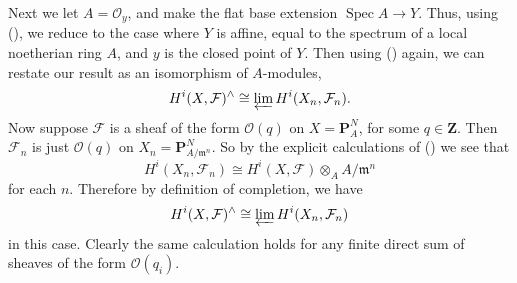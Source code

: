 {Next we let $A=\mathcal O_y$, and make the flat base extension $\operatorname{Spec}A\to Y$. Thus, using (), we reduce to the case where $Y$ is affine, equal to the spectrum of a local noetherian ring $A$, and $y$ is the closed point of $Y$. Then using () again, we can restate our result as an isomorphism of $A$-modules,
\[
 H^i(X,\mathcal F)^\wedge\cong\varprojlim H^i(X_n,\mathcal F_n).
\]
Now suppose $\mathcal F$ is a sheaf of the form $\mathcal O(q)$ on $X=\mathbf P_A^N$, for some $q\in\mathbf Z$. Then $\mathcal F_n$ is just $\mathcal O(q)$ on $X_n=\mathbf P^N_{A/\mathfrak m^n}$. So by the explicit calculations of () we see that
\[
 H^i(X_n,\mathcal F_n)\cong H^i(X,\mathcal F)\otimes_A A/\mathfrak m^n
\]
for each $n$. Therefore by definition of completion, we have
\[
 H^i(X,\mathcal F)^\wedge\cong\varprojlim H^i(X_n,\mathcal F_n)
\]
in this case. Clearly the same calculation holds for any finite direct sum of sheaves of the form $\mathcal O(q_i)$.
}
